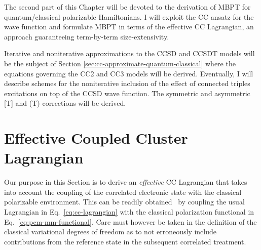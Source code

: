 The second part of this Chapter will be devoted to the derivation of
\acrshort{MBPT} for quantum/classical polarizable Hamiltonians.
I will exploit the \acrshort{CC} ansatz for the wave function and formulate
\acrshort{MBPT} in terms of the effective \acrshort{CC} Lagrangian, an approach
guaranteeing term-by-term size-extensivity.

Iterative and noniterative approximations to the \acrshort{CCSD} and \acrshort{CCSDT} models will
be the subject of Section \ref{sec:cc-approximate-quantum-classical} where the equations
governing the \acrshort{CC2} and \acrshort{CC3} models will be derived.
Eventually, I will describe schemes for the noniterative inclusion of
the effect of connected triples excitations on top of
the \acrshort{CCSD} wave function. The symmetric and asymmetric [T] and (T)
corrections will be derived.

\section{Effective Coupled Cluster Lagrangian}
\label{sec:effective-cc-lagrangian}

Our purpose in this Section is to derive an \emph{effective} \acrshort{CC}
Lagrangian that takes into account the coupling of the correlated
electronic state with the classical polarizable
environment.
This can be readily obtained~\autocite{Lipparini2016-mo} by coupling the
usual Lagrangian in Eq.~\eqref{eq:cc-lagrangian} with the classical
polarization functional in Eq.~\eqref{eq:pcm-mm-functional}.
Care must however be taken in the definition of the classical
variational degrees of freedom as to not erroneously include
contributions from the reference state in the subsequent correlated
treatment.

